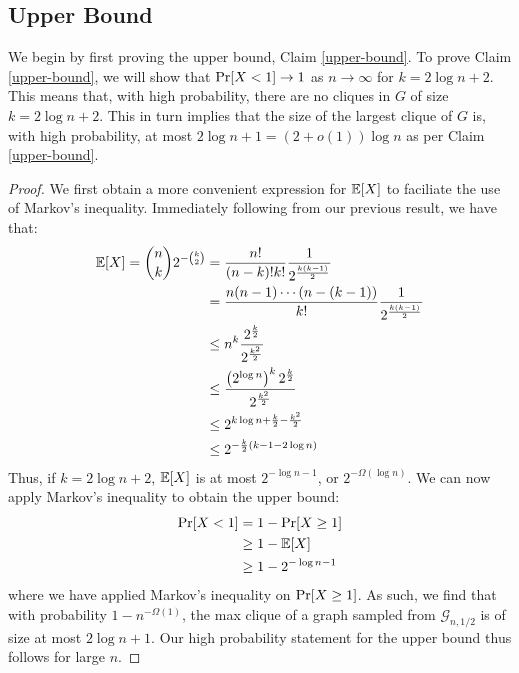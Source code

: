 \documentclass{article}
\begin{document}
\subsection{Upper Bound}
We begin by first proving the upper bound, Claim \ref{upper-bound}. To prove
Claim \ref{upper-bound}, we will show that $\textup{Pr}[X < 1] \to 1$ as $n
\to \infty$ for $k = 2 \log{n} + 2$. This means that, with high probability,
there are no cliques in $G$ of size $k = 2 \log{n} + 2$. This in turn implies that the
size of the largest clique of $G$ is, with high probability, at most $2
\log{n} + 1 = (2 + o(1)) \log{n}$ as per Claim \ref{upper-bound}.
\begin{proof}
    We first obtain a more convenient expression for $\mathbb{E}[X]$ to faciliate
    the use of Markov's inequality.
    Immediately following from our previous
    result, we have that:
    \begin{align*}
        \mathbb{E}[X] = \binom{n}{k} 2^{-\binom{k}{2}} &= \frac{n!}{(n - k)! k!} \frac{1}{2^{\frac{k(k -
        1)}{2}}}
        \\
        &= \frac{n(n - 1) \cdots (n - (k - 1))}{k!} \frac{1}{2^{\frac{k(k -
        1)}{2}}}
        \\
        &\leq n^{k} \frac{2^{\frac{k}{2}}}{2^{\frac{k^{2}}{2}}}
        \\
        &\leq \frac{\left(2^{\log{n}}\right)^{k} 2^{\frac{k}{2}}}{2^{\frac{k^{2}}{2}}}
        \\
        &\leq 2^{k \log{n} + \frac{k}{2} - \frac{k^{2}}{2}}
        \\
        &\leq 2^{-\frac{k}{2} (k - 1 - 2 \log{n})}
    \end{align*}
    Thus, if $k = 2 \log{n} + 2$, $\mathbb{E}[X]$ is at most $2^{-\log{n} - 1}$, or
    $2^{-\Omega({\log{n}})}$. We can now apply Markov's inequality to obtain the
    upper bound:
    \begin{align*}
        \textup{Pr}[X < 1] &= 1 - \textup{Pr}[X \geq 1]
        \\
        &\geq 1 - \mathbb{E}[X]
        \\
        &\geq 1 - 2^{-\log{n} - 1}
    \end{align*}
    where we have applied Markov's inequality on $\textup{Pr}[X \geq 1]$. As such, we find that
    with probability $1 - n^{-\Omega({1})}$, the max clique of a graph sampled from $\mathcal{G}_{n,
    1/2}$ is of size at most $2 \log{n} + 1$. Our high probability
    statement for the upper bound thus follows for large $n$.
\end{proof}
\end{document}
